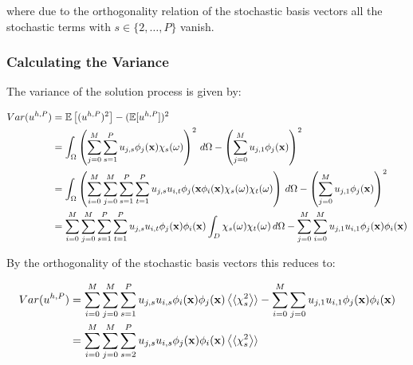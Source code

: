 where due to the orthogonality relation of the stochastic basis vectors all the
stochastic terms with $s \in \{2, \ldots, P\}$ vanish.

\subsubsection{Calculating the Variance}

The variance of the solution process is given by:

\begin{align}
  \begin{split}
      Var(u^{h,P}) &= \mathbb{E}\left[(u^{h,P})^2\right] - (\mathbb{E}[u^{h,P}])^2 \\
        &= \int_\Omega\left(
              \sum_{j=0}^M\sum_{s=1}^Pu_{j,s}\phi_j(\mathbf{x})\chi_s(\omega)
          \right)^2\, d\Omega - \left(\sum_{j=0}^Mu_{j,1}\phi_j(\mathbf{x})\right)^2 \\
          &= \int_\Omega\left(\sum_{i=0}^M\sum_{j=0}^M\sum_{s=1}^P\sum_{t=1}^P
          u_{j,s}u_{i,t}\phi_j(\mathbf{x}\phi_i(\mathbf{x})\chi_s(\omega)\chi_t(\omega)
      \right)\, d\Omega - \left(\sum_{j=0}^Mu_{j,1}\phi_j(\mathbf{x})\right)^2 \\
      &= \sum_{i=0}^M\sum_{j=0}^M\sum_{s=1}^P\sum_{t=1}^Pu_{j,s}u_{i,t}
         \phi_j(\mathbf{x})\phi_i(\mathbf{x})\int_D\chi_s(\omega)\chi_t(\omega)\, d\Omega
         - \sum_{j=0}^M\sum_{i=0}^Mu_{j,1}u_{i,1}\phi_j(\mathbf{x})\phi_i(\mathbf{x})
  \end{split}
\end{align}

By the orthogonality of the stochastic basis vectors this reduces to:

\begin{align}
  \begin{split}
    Var(u^{h,P}) &= \sum_{i=0}^M\sum_{j=0}^M\sum_{s=1}^P
        u_{j,s}u_{i,s}\phi_i(\mathbf{x})\phi_j(\mathbf{x})\left\langle\langle\chi_s^2\right\rangle\rangle -
        \sum_{i=0}^M\sum_{j=0}u_{j,1}u_{i,1}\phi_j(\mathbf{x})\phi_i(\mathbf{x}) \\
      &= \sum_{i=0}^M\sum_{j=0}^M\sum_{s=2}^P
        u_{j,s}u_{i,s}\phi_j(\mathbf{x})\phi_i(\mathbf{x})\left\langle\langle\chi_s^2\right\rangle\rangle
  \end{split}
\end{align}
